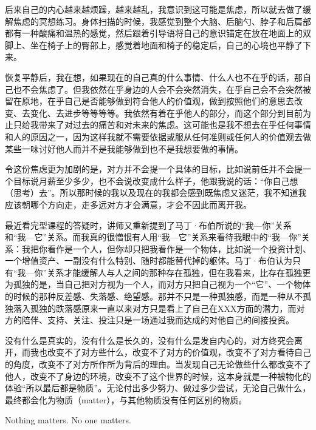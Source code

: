后来自己的内心越来越烦躁，越来越乱，我意识到这可能是焦虑，所以就去做了缓解焦虑的冥想练习。身体扫描的时候，我感觉到整个大脑、后脑勺、脖子和后肩部都有一种酸痛和温热的感觉，然后跟着引导语将自己的意识锚定在放在地面上的双脚上、坐在椅子上的臀部上，感觉着地面和椅子的稳定后，自己的心境也平静了下来。

恢复平静后，我在想，如果现在的自己真的什么事情、什么人也不在乎的话，那自己也不会焦虑了。但我依然在乎身边的人会不会突然消失，在乎自己会不会突然被留在原地，在乎自己是否能够做到符合他人的价值观，做到按照他们的意思去改变、去变化、去进步等等等等。我依然有着在乎他人的部分，而这个部分到目前为止只给我带来了对过去的痛苦和对未来的焦虑。这可能也是我不想去在乎任何事情和人的原因之一，因为这样我就不需要依据或服从任何准则或任何人的价值观去做某些一味讨好他人而并不是我能够做到也不是我想要做的事情。

令这份焦虑更为加剧的是，对方并不会提一个具体的目标，比如说前任并不会提一个目标说月薪至少多少，也不会说改变成什么样子，他跟我说的话：“你自己想（思考）去”。所以那时候的我以及现在的我都会感到既焦虑又迷茫，我不知道我应该朝哪个方向走，走多远对方才会满意，才会不因此而离开我。

最近看完型课程的答疑时，讲师又重新提到了马丁·布伯所说的“我—你”关系和“我—它”关系。而我真的很憎恨有人用“我—它”关系来看待我眼中的“我—你”关系：我把你看作是一个人，但你却只把我看作是一个物体，比如说一个投资计划、一个增值资产、一副没有什么特别、随时都能替代掉的躯体。马丁·布伯认为只有“我—你”关系才能缓解人与人之间的那种存在孤独，但在我看来，比存在孤独更为孤独的是，当自己把对方视为一个人，而对方只把自己视为一个“它”、一个物体的时候的那种反差感、失落感、绝望感。那并不只是一种孤独感，而是一种从不孤独落入孤独的跌落感\pozhehao{}原来一直以来对方只是看上了自己在XXX方面的潜力，而对方的陪伴、支持、关注、投注只是一场通过我而达成的对他自己的间接投资。

没有什么是真实的，没有什么是长久的，没有什么是发自内心的，对方终究会离开，而我也改变不了对方些什么，改变不了对方的价值观，改变不了对方看待自己的角度，改变不了对方所作所为背后的理由。当发现自己无论做些什么都改变不了他人，改变不了身边的环境，改变不了这个世界的时候，这本身就是一种被物化的体验\pozhehao{}“所以最后都是物质”。无论付出多少努力、做过多少尝试，无论自己做什么，最终都会化为物质（matter），与其他物质没有任何区别的物质。

Nothing matters. No one matters.

